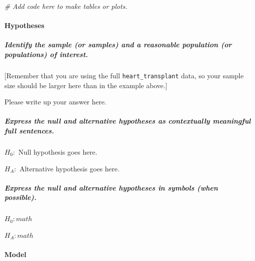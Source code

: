 \documentclass[
]{book}
\newenvironment{Shaded}{\begin{snugshade}}{\end{snugshade}}
\newcommand{\CommentTok}[1]{\textcolor[rgb]{0.56,0.35,0.01}{\textit{#1}}}
\begin{document}
\begin{Shaded}
\begin{Highlighting}[]
\CommentTok{\# Add code here to make tables or plots.}
\end{Highlighting}
\end{Shaded}

\hypertarget{hypotheses-2}{%
\paragraph*{Hypotheses}\label{hypotheses-2}}

\hypertarget{identify-the-sample-or-samples-and-a-reasonable-population-or-populations-of-interest.-2}{%
\subparagraph*{Identify the sample (or samples) and a reasonable population (or populations) of interest.}\label{identify-the-sample-or-samples-and-a-reasonable-population-or-populations-of-interest.-2}}

{[}Remember that you are using the full \texttt{heart\_transplant} data, so your sample size should be larger here than in the example above.{]}

Please write up your answer here.

\hypertarget{express-the-null-and-alternative-hypotheses-as-contextually-meaningful-full-sentences.-2}{%
\subparagraph*{Express the null and alternative hypotheses as contextually meaningful full sentences.}\label{express-the-null-and-alternative-hypotheses-as-contextually-meaningful-full-sentences.-2}}

\(H_{0}:\) Null hypothesis goes here.

\(H_{A}:\) Alternative hypothesis goes here.

\hypertarget{express-the-null-and-alternative-hypotheses-in-symbols-when-possible.-2}{%
\subparagraph*{Express the null and alternative hypotheses in symbols (when possible).}\label{express-the-null-and-alternative-hypotheses-in-symbols-when-possible.-2}}

\(H_{0}: math\)

\(H_{A}: math\)

\hypertarget{model-2}{%
\paragraph*{Model}\label{model-2}}
\end{document}
